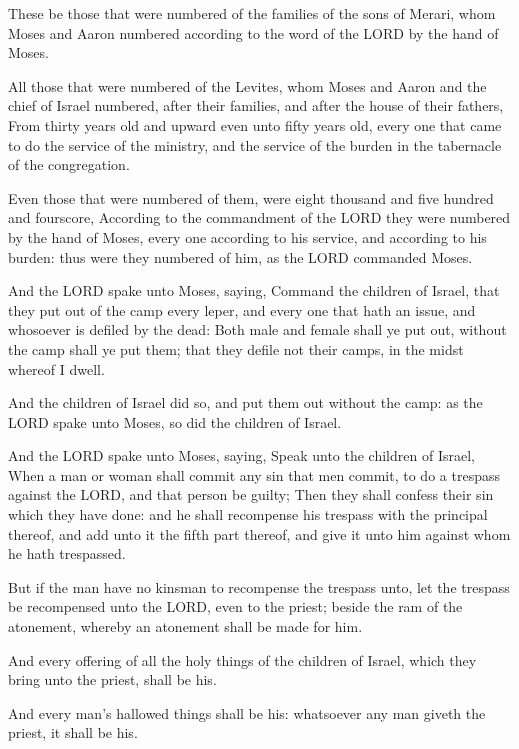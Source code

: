 \Verse These be those that were numbered of the families of the sons of
Merari, whom Moses and Aaron numbered according to the word of the
LORD by the hand of Moses.

\Verse All those that were numbered of the Levites, whom Moses and Aaron
and the chief of Israel numbered, after their families, and after the
house of their fathers, \Verse From thirty years old and upward even
unto fifty years old, every one that came to do the service of the
ministry, and the service of the burden in the tabernacle of the
congregation.

\Verse Even those that were numbered of them, were eight thousand and
five hundred and fourscore, \Verse According to the commandment of the
LORD they were numbered by the hand of Moses, every one according to
his service, and according to his burden: thus were they numbered of
him, as the LORD commanded Moses.


\Chapter
\Verse And the LORD spake unto Moses, saying, \Verse Command the children of
Israel, that they put out of the camp every leper, and every one that
hath an issue, and whosoever is defiled by the dead: \Verse Both male and
female shall ye put out, without the camp shall ye put them; that they
defile not their camps, in the midst whereof I dwell.

\Verse And the children of Israel did so, and put them out without the
camp: as the LORD spake unto Moses, so did the children of Israel.

\Verse And the LORD spake unto Moses, saying, \Verse Speak unto the children
of Israel, When a man or woman shall commit any sin that men commit,
to do a trespass against the LORD, and that person be guilty; \Verse Then
they shall confess their sin which they have done: and he shall
recompense his trespass with the principal thereof, and add unto it
the fifth part thereof, and give it unto him against whom he hath
trespassed.

\Verse But if the man have no kinsman to recompense the trespass unto,
let the trespass be recompensed unto the LORD, even to the priest;
beside the ram of the atonement, whereby an atonement shall be made
for him.

\Verse And every offering of all the holy things of the children of
Israel, which they bring unto the priest, shall be his.

\Verse And every man's hallowed things shall be his: whatsoever any man
giveth the priest, it shall be his.

